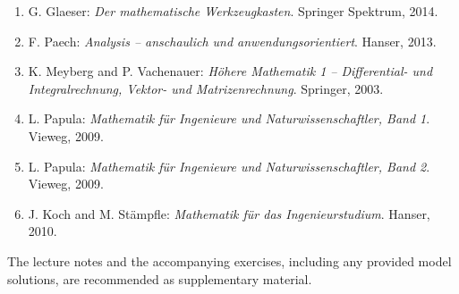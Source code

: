 
\begin{enumerate}[itemsep=0.2em,topsep=0.3em]
  \item G. Glaeser: \emph{Der mathematische Werkzeugkasten}.
    Springer Spektrum, 2014.
  \item F. Paech: \emph{Analysis -- anschaulich und anwendungsorientiert}.
    Hanser, 2013.
  \item K. Meyberg and P. Vachenauer: \emph{Höhere Mathematik 1 --
    Differential- und Integralrechnung, Vektor- und Matrizenrechnung}.
    Springer, 2003.
  \item L. Papula: \emph{Mathematik für Ingenieure und Naturwissenschaftler,
    Band 1}. Vieweg, 2009.
  \item L. Papula: \emph{Mathematik für Ingenieure und Naturwissenschaftler,
    Band 2}. Vieweg, 2009.
  \item J. Koch and M. Stämpfle: \emph{Mathematik für das Ingenieurstudium}.
    Hanser, 2010.
\end{enumerate}

The lecture notes and the accompanying exercises, including any provided model
solutions, are recommended as supplementary material.
